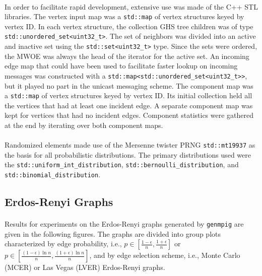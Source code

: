 \documentclass[11pt,epsf]{article}
\begin{document}
{{    \paragraph{}{
      In order to facilitate rapid development, extensive use was made of the C++ STL
      libraries. The vertex input map was a \texttt{std::map}\autocite{map}
      of vertex structures keyed by vertex ID. In each vertex structure, the collection
      GHS tree children was of type \texttt{std::unordered\_set<uint32\_t>}\autocite{unorderedset}.
      The set of neighbors was divided into an active and inactive set using the
      \texttt{std::set<uint32\_t>}\autocite{set} type. Since the sets were ordered,
      the MWOE was always the head of the iterator for the active set.
      An incoming edge map that could have been used to facilitate faster lookup on incoming messages
      was constructed with a \texttt{std::map<std::unordered\_set<uint32\_t>>}, but it played no
      part in the unicast messaging scheme. The component map was a \texttt{std::map}\autocite{map}
      of vertex structures keyed by vertex ID. Its initial collection held all the
      vertices that had at least one incident edge. A separate component map was kept
      for vertices that had no incident edges. Component statistics were gathered at the
      end by iterating over both component maps.
    }
    \paragraph{}{
      Randomized elements\autocite{random} made use of the Mersenne twister PRNG \texttt{std::mt19937}\autocite{mt19337}
      as the basis for all probabilistic distributions. The primary distributions used were
      the \texttt{std::uniform\_int\_distribution}\autocite{uniformintdist},
      \texttt{std::bernoulli\_distribution}\autocite{bernoullidist}, and
      \texttt{std::binomial\_distribution}\autocite{binomialdist}.
    }
  }


  \subsection{Erdos-Renyi Graphs}{
    \paragraph{}{
      Results for experiments on the Erdos-Renyi graphs generated by \texttt{genmpig}
      are given in the following figures. The graphs are divided into group plots characterized
      by edge probability, i.e., $p \in [\frac{1-\epsilon}{n}, \frac{1+\epsilon}{n}]$ or
      $p \in [\frac{(1-\epsilon)\ln n}{n}, \frac{(1+\epsilon)\ln n}{n}]$, and by
      edge selection scheme, i.e., Monte Carlo (MCER) or Las Vegas (LVER) Erdos-Renyi graphs.
    }
}}
\end{document}
